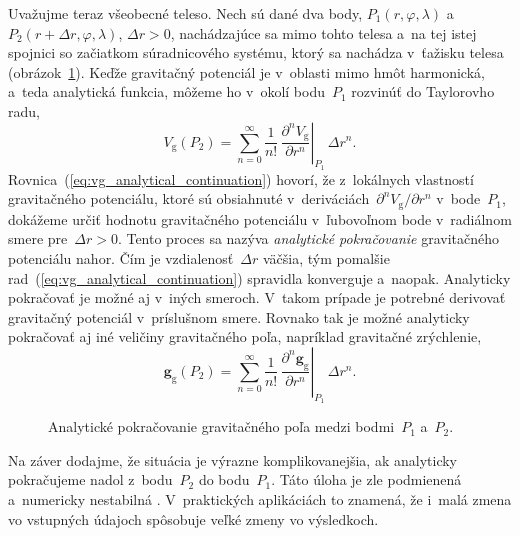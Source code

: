 \documentclass[a4paper, 12pt]{book}
\newcommand{\gidx}{\mathrm g}
\let\vec\mathbf
\begin{document}
Uvažujme teraz všeobecné teleso.  Nech sú dané dva body,
$P_1(r, \varphi, \lambda)$ a~$P_2(r + \Delta r, \varphi, \lambda)$, $\Delta
r > 0$, nachádzajúce sa mimo tohto telesa a~na tej istej spojnici so začiatkom
súradnicového systému, ktorý sa nachádza v~ťažisku telesa
(obrázok~\ref{fig:analytical_continuation}).  Keďže gravitačný potenciál je 
v~oblasti mimo hmôt harmonická, a~teda analytická funkcia, môžeme ho v~okolí 
bodu~$P_1$ rozvinúť do Taylorovho radu,
%
\begin{equation}
\label{eq:vg_analytical_continuation}
V_\gidx(P_2) = \sum_{n = 0}^\infty \frac{1}{n!} \, \left.\frac{\partial^n
V_\gidx}{\partial r^n}\right|_{P_1} \, \Delta r^n{.}
\end{equation}
%
Rovnica~(\ref{eq:vg_analytical_continuation}) hovorí, že z~lokálnych vlastností 
gravitačného potenciálu, ktoré sú obsiahnuté v~deriváciách~$\partial^n V_\gidx 
\slash \partial r^n$ v~bode~$P_1$, dokážeme určiť hodnotu gravitačného 
potenciálu v~ľubovoľnom bode v~radiálnom smere pre~$\Delta r > 0$.  Tento 
proces sa nazýva \emph{analytické pokračovanie} gravitačného potenciálu nahor.  
Čím je vzdialenosť~$\Delta r$ väčšia, tým pomalšie 
rad~(\ref{eq:vg_analytical_continuation}) spravidla konverguje a~naopak.  
Analyticky pokračovať je možné aj v~iných smeroch.  V~takom prípade je potrebné 
derivovať gravitačný potenciál v~príslušnom smere.  Rovnako tak je možné 
analyticky pokračovať aj iné veličiny gravitačného poľa, napríklad gravitačné 
zrýchlenie,
%
\begin{equation}
\label{eq:gg_analytical_continuation}
\vec g_\gidx(P_2) = \sum_{n = 0}^{\infty} \frac{1}{n!} \, 
\left.\frac{\partial^n \vec
g_\gidx}{\partial r^n}\right|_{P_1} \, \Delta r^n{.}
\end{equation}

\begin{figure}
\centering

\caption{Analytické pokračovanie gravitačného poľa medzi bodmi~$P_1$ a~$P_2$.}
\label{fig:analytical_continuation}
\end{figure}

Na záver dodajme, že situácia je výrazne komplikovanejšia, ak analyticky 
pokračujeme nadol z~bodu~$P_2$ do bodu~$P_1$.  Táto úloha je zle podmienená 
a~numericky nestabilná \parencite{SansoGeodeticBoundaryValueProblem}.  
V~praktických aplikáciách to znamená, že i~malá zmena vo vstupných údajoch 
spôsobuje veľké zmeny vo výsledkoch.
\end{document}
